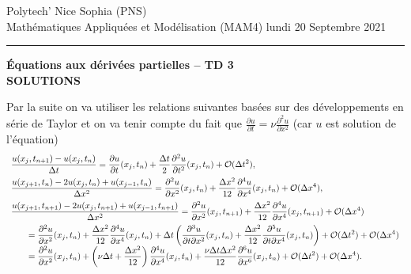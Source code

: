 \documentclass[12pt,a4paper]{article}
\begin{document}
 \hfill Polytech' Nice Sophia (PNS)\\
\noindent Math\'ematiques Appliqu\'ees et Mod\'elisation (MAM4) \hfill lundi 20 Septembre 2021 \\

\hrule

\bigskip
\bigskip

\begin{center}{\bf \'Equations aux d\'eriv\'ees partielles --
TD 3\\ SOLUTIONS}\end{center}

\bigskip


\noindent Par la suite on va utiliser les relations suivantes
bas\'ees sur des d\'eveloppements en s\'erie de Taylor et on va tenir compte du fait que $\frac{\partial u}{\partial t} = \nu
\frac{\partial^2 u}{\partial x^2}$ (car $u$ est solution de l'\'equation)
\begin{equation}\label{eq:util}
\begin{array}{l}
\displaystyle \frac{u(x_j,t_{n+1})-u(x_j,t_n)}{\Delta t}  = 
\displaystyle\frac{\partial u}{\partial t}(x_j,t_n) + \frac{\Delta t}{2}
\frac{\partial^2 u}{\partial t^2}(x_j,t_n)+{\cal O}(\Delta t^2),\\[2ex]
\displaystyle \frac{u(x_{j+1},t_n)-2u(x_j,t_n)+u(x_{j-1},t_n)}{\Delta
  x^2}  = \displaystyle\frac{\partial^2 u}{\partial
  x^2}(x_j,t_n)+\frac{\Delta x^2}{12}\frac{\partial^4 u}{\partial
  x^4}(x_j,t_n)+{\cal O}(\Delta x^4),\\[2ex]
\displaystyle \frac{u(x_{j+1},t_{n+1})-2u(x_j,t_{n+1})+u(x_{j-1},t_{n+1})}{\Delta
  x^2}  = \displaystyle\frac{\partial^2 u}{\partial
  x^2}(x_j,t_{n+1})+\frac{\Delta x^2}{12}\frac{\partial^4 u}{\partial
  x^4}(x_j,t_{n+1})+{\cal O}(\Delta x^4) \\[2ex]
\qquad = \displaystyle\frac{\partial^2 u}{\partial
  x^2}(x_j,t_n)+\frac{\Delta x^2}{12}\frac{\partial^4 u}{\partial
  x^4}(x_j,t_n)+\displaystyle \Delta t\left(\frac{\partial^3u}{\partial t\partial
    x^2}(x_j,t_n)+\frac{\Delta x^2}{12}\frac{\partial^5u}{\partial t\partial
    x^4}(x_j,t_n)\right)+{\cal O}(\Delta t^2) +{\cal O}(\Delta x^4)\\
\qquad = \displaystyle\frac{\partial^2 u}{\partial
  x^2}(x_j,t_n)+\left(\nu\Delta t+ \frac{\Delta x^2}{12}\right) \frac{\partial^4 u}{\partial
  x^4}(x_j,t_n)+\frac{\nu\Delta t \Delta x^2}{12}\frac{\partial^6 u}{\partial
  x^6}(x_j,t_n) +{\cal O}(\Delta t^2) +{\cal O}(\Delta x^4).
\end{array}
\end{equation}
\end{document}
